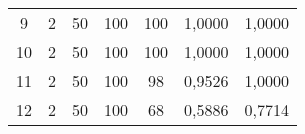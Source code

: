 \begin{table}[H]
\begin{tabular}{@{}ccccccc@{}}
9  & 2                                                     & 50                                                        & 100 & 100 & 1,0000        & 1,0000       \\
10 & 2                                                     & 50                                                        & 100 & 100 & 1,0000        & 1,0000       \\
11 & 2                                                     & 50                                                        & 100 & 98  & 0,9526        & 1,0000       \\
12 & 2                                                     & 50                                                        & 100 & 68  & 0,5886        & 0,7714       \\ \bottomrule
\end{tabular}
\end{table}


